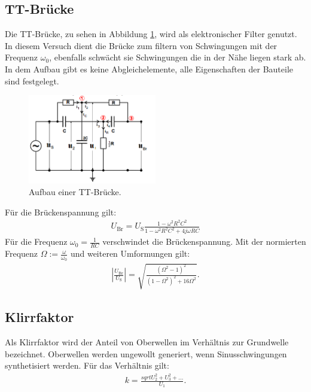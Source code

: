 \subsection{TT-Brücke}
Die TT-Brücke, zu sehen in Abbildung \ref{fig:tt}, wird als elektronischer Filter genutzt.
In diesem Versuch dient die Brücke zum filtern von Schwingungen mit der Frequenz $\omega_0$, ebenfalls schwächt sie Schwingungen die in der Nähe liegen stark ab.
In dem Aufbau gibt es keine Abgleichelemente, alle Eigenschaften der Bauteile sind festgelegt.
\begin{figure}
 \centering
 \includegraphics[width=0.5\textwidth]{tt.PNG}
 \caption{Aufbau einer TT-Brücke.}
 \label{fig:tt}
 \end{figure}
Für die Brückenspannung gilt:
\begin{align}
  U_\mathrm{Br}=U_\mathrm{S}\frac{1-\omega^2 R^2 C^2}{1-\omega^2 R^2 C^2 + 4j \omega R C}\label{eqn:ubr}
\end{align}
Für die Frequenz $\omega_0=\frac{1}{RC}$ verschwindet die Brückenspannung.
Mit der normierten Frequenz $\Omega:=\frac{\omega}{\omega_0}$ und weiteren Umformungen gilt:
\begin{align}
  \left|\frac{U_\mathrm{Br}}{U_\mathrm{S}}\right|=\sqrt{\frac{\left(\Omega^2-1\right)^2}{\left(1-\Omega^2\right)^2+16\Omega^2}}\label{eqn:TT}.
\end{align}
\subsection{Klirrfaktor}
Als Klirrfaktor wird der Anteil von Oberwellen im Verhältnis zur Grundwelle bezeichnet. Oberwellen werden ungewollt generiert, wenn Sinusschwingungen synthetisiert werden.
Für das Verhältnis gilt:
\begin{align}
  k=\frac{sqrt{U_2^2+U_3^2+...}}{U_1}\label{eqn:klirr}.
\end{align}
